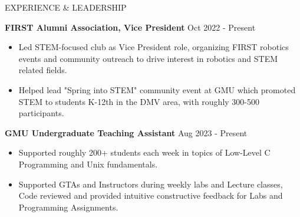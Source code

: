 \documentclass{resume} %
\begin{document}
\begin{rSection}{EXPERIENCE \& LEADERSHIP}

\textbf{FIRST Alumni Association, Vice President} \hfill Oct 2022 - Present
 \begin{itemize}
    \itemsep -3pt {} 
     \item Led STEM-focused club as Vice President role, organizing FIRST robotics events and community outreach to drive interest in robotics and STEM related fields.
     \item Helped lead "Spring into STEM" community event at GMU which promoted STEM to students K-12th in the DMV area, with roughly 300-500 participants.
 \end{itemize}

\textbf{GMU Undergraduate Teaching Assistant} \hfill Aug 2023 - Present
 \begin{itemize}
    \itemsep -3pt {}
     \item Supported roughly 200+ students each week in topics of Low-Level C Programming and Unix fundamentals.
     \item Supported GTAs and Instructors during weekly labs and Lecture classes, Code reviewed and provided intuitive constructive feedback for Labs and Programming Assignments.
 \end{itemize}

\end{rSection} 

\end{document}
